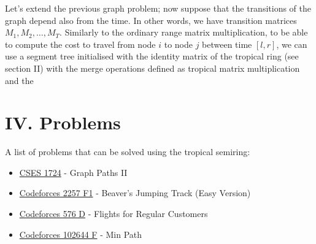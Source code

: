 \documentclass{article}
\begin{document}
Let's extend the previous graph problem; now suppose that the transitions of the graph depend also from the time. In other words, we have transition matrices $M_1, M_2, \dots, M_T$. Similarly to the ordinary range matrix multiplication, to be able to compute the cost to travel from node $i$ to node $j$ between time $[l, r]$, we can use a segment tree initialised with the identity matrix of the tropical ring (see section II) with the merge operations defined as tropical matrix multiplication and the 

\section*{IV. Problems}

A list of problems that can be solved using the tropical semiring:

\begin{itemize}
    \item \href{https://cses.fi/problemset/task/1724/}{CSES 1724} - Graph Paths II
    \item \href{https://codeforces.com/contest/2257/problem/F1}{Codeforces 2257 F1} - Beaver's Jumping Track (Easy Version)
    \item \href{https://codeforces.com/problemset/problem/576/D}{Codeforces 576 D} - Flights for Regular Customers
    \item \href{https://codeforces.com/gym/102644/problem/F}{Codeforces 102644 F} - Min Path
\end{itemize}
\end{document}
